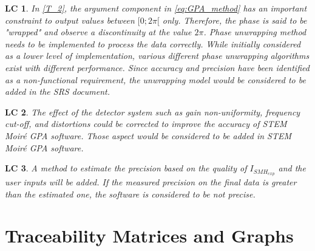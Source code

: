 \documentclass[12pt]{article}
\newcommand{\progname}{STEM Moir{\'e} GPA}
\newtheorem{LC}{LC}
\begin{document}
\begin{LC}
\label{LC_2}
\normalfont In \cref{T_2}, the argument component in \cref{eq:GPA_method} has an 
important constraint to output values between $[0;2\pi[$ only. Therefore, the 
phase is said to be "wrapped" and observe a discontinuity at the value $2\pi$. 
Phase unwrapping method needs to be implemented to process the data correctly. 
While initially considered as a lower level of implementation, various different 
phase unwrapping algorithms exist with different performance. Since accuracy and 
precision have been identified as a non-functional requirement, the unwrapping 
model would be considered to be added in the SRS document. 
\end{LC}

\begin{LC}
\label{LC_3}
\normalfont The effect of the detector system such as gain non-uniformity, 
frequency cut-off, and distortions could be corrected to improve the accuracy of 
\progname{} software. Those aspect would be considered to be added in 
\progname{} software.
\end{LC}

\begin{LC}
\label{LC_4}
\normalfont A method to estimate the precision based on the quality of 
$I_{SMH_{exp}}$ and the user inputs will be added. If the measured precision on 
the final data is greater than the estimated one, the software is considered to 
be not precise. 
\end{LC}

\section{Traceability Matrices and Graphs}
\end{document}
